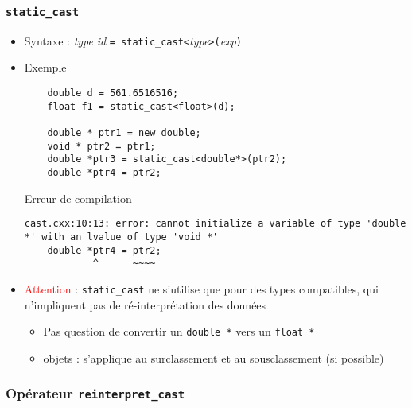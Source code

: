 \begin{frame}[fragile]
\frametitle{\texttt{static\_cast}}
\begin{itemize}
\item Syntaxe : \textit{type} \textit{id} \verb|= static_cast<|\textit{type}\verb|>|\verb|(|\textit{exp}\verb|)|
\item Exemple
\begin{lstlisting}
    double d = 561.6516516;
    float f1 = static_cast<float>(d);

    double * ptr1 = new double;
    void * ptr2 = ptr1;
    double *ptr3 = static_cast<double*>(ptr2);
    double *ptr4 = ptr2;
\end{lstlisting}
\begin{block}{Erreur de compilation}
{\tiny
\begin{verbatim}
cast.cxx:10:13: error: cannot initialize a variable of type 'double *' with an lvalue of type 'void *'
    double *ptr4 = ptr2;
            ^      ~~~~
\end{verbatim}
}
\end{block}
\item \textcolor{red}{Attention} : \verb|static_cast| ne s'utilise que pour des types compatibles, qui n'impliquent pas de ré-interprétation des données
\begin{itemize}
\item Pas question de convertir un \verb|double *| vers un \verb|float *|
\item objets : s'applique au surclassement et au sousclassement (si possible)
\end{itemize}
\end{itemize}
\end{frame}

\subsubsection{Opérateur \texttt{reinterpret\_cast}}

